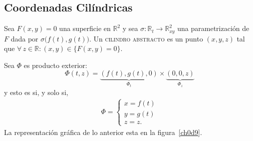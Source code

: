 \documentclass[mid,fleqn,draft,twoside]{notasdeclase}
\renewcommand{\t}{\times}
\newcommand{\R}{\mathbb{R}}
\begin{document}
\begin{samepage}
	\subsection{Coordenadas Cilíndricas}
\end{samepage}

\noindent
Sea $F(x,y) = 0$ una superficie en $\R^2$ y sea $\sigma\colon\R_t\to\R^2_{xy}$ una parametrización de $F$ dada por $\sigma\big(f(t),g(t)\big)$. Un \textsc{cilindro abstracto} es un punto $(x,y,z)$ tal que $\forall\,z\in\R:(x,y)\in\{F(x,y)=0\}.$ 

Sea $\Phi$ es producto exterior:
\[ \Phi(t,z) = \underbrace{(f(t),g(t),0)}_{\Phi_t}\t\underbrace{(0,0,z)}_{\Phi_z} \]
y esto es si, y solo si,
\begin{align}
	\Phi = \begin{cases}
	x=f(t) \\
	y=g(t) \\
	z=z.
	\end{cases}\label{cilincoord}
\end{align}
La representación gráfica de lo anterior esta en la figura~\ref{ch0d9}.  
%
\end{document}
